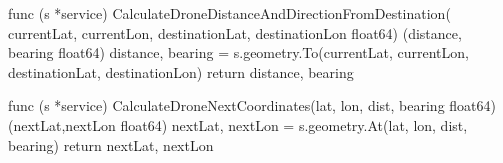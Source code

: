 \begin{python}
    func (s *service) CalculateDroneDistanceAndDirectionFromDestination(
    currentLat, currentLon, destinationLat, destinationLon float64)
    (distance, bearing float64) {
        distance, bearing = s.geometry.To(currentLat,
        currentLon, destinationLat, destinationLon)
        return distance, bearing
    }

    func (s *service) CalculateDroneNextCoordinates(lat, lon,
    dist, bearing float64) (nextLat,nextLon float64) {
        nextLat, nextLon = s.geometry.At(lat, lon, dist, bearing)
        return nextLat, nextLon
    }
\end{python}


